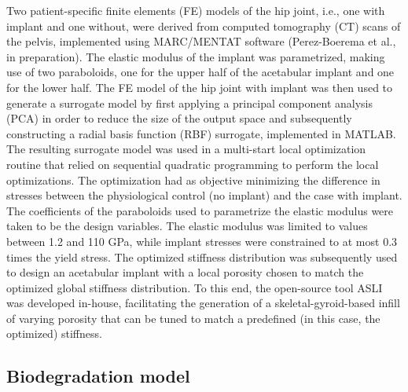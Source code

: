 Two patient-specific finite elements (FE) models of the hip joint, i.e., one with implant and one without, were derived from computed tomography (\gls{CT}) scans of the pelvis, implemented using MARC/MENTAT software (Perez-Boerema et al., in preparation). The elastic modulus of the implant was parametrized, making use of two paraboloids, one for the upper half of the acetabular implant and one for the lower half. The FE model of the hip joint with implant was then used to generate a surrogate model by first applying a principal component analysis (\gls{PCA}) in order to reduce the size of the output space and subsequently constructing a radial basis function (\gls{RBF}) surrogate, implemented in MATLAB. The resulting surrogate model was used in a multi-start local optimization routine that relied on sequential quadratic programming to perform the local optimizations. The optimization had as objective minimizing the difference in stresses between the physiological control (no implant) and the case with implant. The coefficients of the paraboloids used to parametrize the elastic modulus were taken to be the design variables. The elastic modulus was limited to values between 1.2 and 110 GPa, while implant stresses were constrained to at most 0.3 times the yield stress. The optimized stiffness distribution was subsequently used to design an acetabular implant with a local porosity chosen to match the optimized global stiffness distribution. To this end, the open-source tool ASLI \cite{Perez-Boerema2022} was developed in-house, facilitating the generation of a skeletal-gyroid-based infill of varying porosity that can be tuned to match a predefined (in this case, the optimized) stiffness.

\subsection{Biodegradation model}

